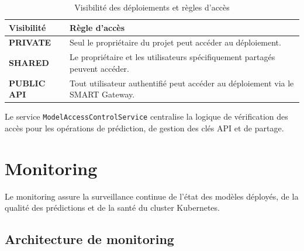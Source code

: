 \begin{table}[H]

\centering
\small

\renewcommand{\arraystretch}{1.15}

\begin{tabular}{|p{3cm}|p{10cm}|}

\hline

\rowcolor{cyan!20}
\textbf{Visibilité}
&
\textbf{Règle d'accès}
\\
\hline

\textbf{PRIVATE}
&
Seul le propriétaire du projet peut accéder au déploiement.
\\
\hline

\rowcolor{cyan!7}
\textbf{SHARED}
&
Le propriétaire et les utilisateurs spécifiquement partagés peuvent
accéder.
\\
\hline

\textbf{PUBLIC API}
&
Tout utilisateur authentifié peut accéder au déploiement via le
SMART Gateway.
\\
\hline

\end{tabular}

\caption{Visibilité des déploiements et règles d'accès}
\label{tab:sprint3-visibility}

\end{table}

Le service \texttt{ModelAccessControlService} centralise la logique
de vérification des accès pour les opérations de prédiction, de
gestion des clés API et de partage.



\section{Monitoring}
\label{sec:sprint3-monitoring}

Le monitoring assure la surveillance continue de l'état des modèles
déployés, de la qualité des prédictions et de la santé du cluster
Kubernetes.


\subsection{Architecture de monitoring}
\label{subsec:sprint3-monitoring-arch}

